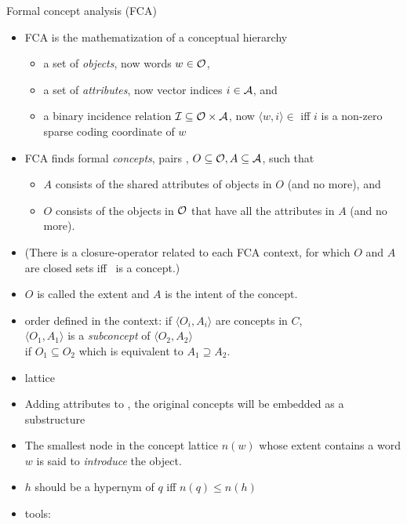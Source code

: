 \documentclass{beamer}
\newlength{\onecolwid}
\begin{document}
\begin{frame}[t]
\begin{columns}[t]
\begin{column}{\onecolwid}
\begin{block}{Formal concept analysis (FCA)} 
  \begin{itemize}
    \item FCA is the mathematization of a conceptual hierarchy 
      \begin{itemize}
        \item a set of \emph{objects}, now words $w\in\mathcal O$, 
        \item a set of \emph{attributes}, now vector indices $i\in\mathcal A$, and
        \item a binary incidence relation 
          $\mathcal I \subseteq \mathcal O \times \mathcal A$,
          now 
          $\langle w,i\rangle\in$
          iff
          $i$ is a  non-zero sparse coding coordinate of $w$
      \end{itemize}
    \item FCA finds formal \emph{concepts}, pairs \oaconc,
      $O\subseteq \mathcal O,A \subseteq \mathcal A$, such that
      \begin{itemize}
        \item $A$ consists of the shared attributes of objects in $O$
          (and no more), and
        \item $O$ consists of
          the objects in $\mathcal O$ that have all the attributes in $A$ (and
          no more).
      \end{itemize}
    \item (There is a closure-operator related to each FCA context, for
      which $O$ and $A$ are closed sets iff \oaconc~is a concept.)
    \item $O$ is called the extent and $A$ is the intent of the concept.  
    \item order defined in the context: 
      if $\langle O_i , A_i \rangle$ are concepts in $C$, \\ 
      $\langle O_1 , A_1 \rangle$ is a \emph{subconcept} of $\langle
      O_2 , A_2 \rangle$ \\
      if $O_1 \subseteq O_2 $ which is equivalent to $A_1 \supseteq A_2 $.  
    \item lattice
    \item Adding attributes to \at,
      the original concepts will be embedded as a substructure 
    \item The smallest node in the concept lattice $n(w)$ whose extent contains a word
      $w$ is said to \emph{introduce} the object.
    \item $h$ should be a hypernym of $q$ iff $n(q)\le n(h)$ 
    \item tools: \citet{Endres:2010,Cimiano:2005}
  \end{itemize}
\end{block} 


\end{column}
\end{columns}
\end{frame}
\end{document}
